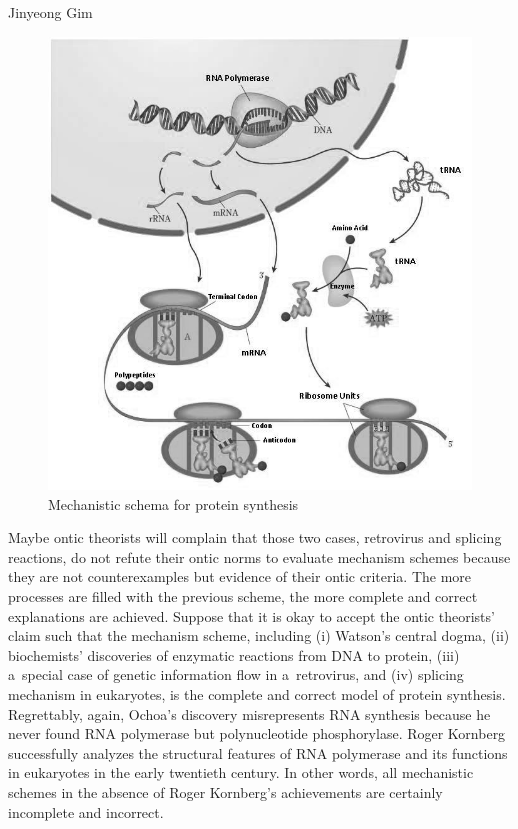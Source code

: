 \begin{artengenv}{Jinyeong Gim}
\begin{figure}[H]
 \begin{center}
 \includegraphics[width=.8\textwidth]{ART_Gim/fig.6_bw.jpg}%
 \end{center}%
 \caption{Mechanistic schema for protein synthesis
 }\label{gim.fig6}
\end{figure}

Maybe ontic theorists will complain that those two cases, retrovirus and splicing reactions, do not refute their ontic norms to evaluate mechanism schemes because they are not counterexamples but evidence of their ontic criteria. The more processes are filled with the previous scheme, the more complete and correct explanations are achieved. Suppose that it is okay to accept the ontic theorists' claim such that the mechanism scheme, including (i) Watson's central dogma, (ii) biochemists' discoveries of enzymatic reactions from DNA to protein, (iii) a~special case of genetic information flow in a~retrovirus, and (iv) splicing mechanism in eukaryotes, is the complete and correct model of protein synthesis. Regrettably, again, Ochoa's discovery misrepresents RNA synthesis because he never found RNA polymerase but polynucleotide phosphorylase. Roger Kornberg successfully analyzes the structural features of RNA polymerase and its functions in eukaryotes in the early twentieth century. In other words, all mechanistic schemes in the absence of Roger Kornberg's achievements are certainly incomplete and incorrect.


\end{artengenv}
